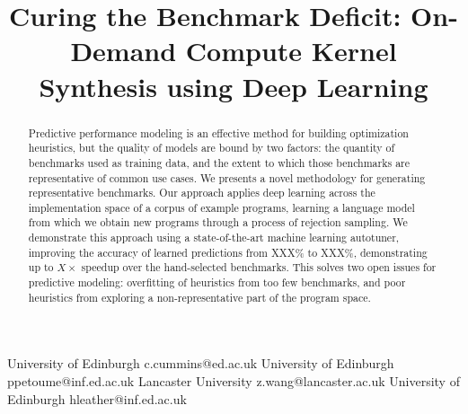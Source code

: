 \documentclass[preprint,nonatbib,10pt,nocopyrightspace]{sigplanconf}
\begin{document}
\setlength{\pdfpageheight}{\paperheight}
\setlength{\pdfpagewidth}{\paperwidth}





\preprintfooter{}   %

\title{Curing the Benchmark Deficit:%
  On-Demand Compute Kernel Synthesis using Deep Learning}


           {University of Edinburgh}
           {c.cummins@ed.ac.uk}
           {University of Edinburgh}
           {ppetoume@inf.ed.ac.uk}
           {Lancaster University}
           {z.wang@lancaster.ac.uk}
           {University of Edinburgh}
           {hleather@inf.ed.ac.uk}

\maketitle

\begin{abstract}
  Predictive performance modeling is an effective method for building
  optimization heuristics, but the quality of models are bound by two
  factors: the quantity of benchmarks used as training data, and the
  extent to which those benchmarks are representative of common use
  cases. We presents a novel methodology for generating representative
  benchmarks. Our approach applies deep learning across the
  implementation space of a corpus of example programs, learning a
  language model from which we obtain new programs through a process
  of rejection sampling.%
  We demonstrate this approach using a state-of-the-art machine
  learning autotuner, improving the accuracy of learned predictions
  from XXX\% to XXX\%, demonstrating up to $X\times$ speedup over the
  hand-selected benchmarks. This solves two open issues for predictive
  modeling: overfitting of heuristics from too few benchmarks, and
  poor heuristics from exploring a non-representative part of the
  program space.
\end{abstract}
\end{document}
